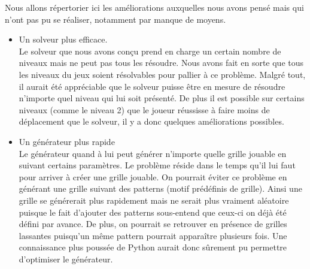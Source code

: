 \documentclass[a4paper,12pt]{article}
\begin{document}
Nous allons répertorier ici les améliorations auxquelles nous avons pensé mais qui n'ont pas pu se réaliser, notamment par manque de moyens.
\begin{itemize}
\item Un solveur plus efficace.\\
Le solveur que nous avons conçu prend en charge un certain nombre de niveaux mais ne peut pas tous les résoudre. Nous avons fait en sorte que tous les niveaux du jeux soient résolvables pour pallier à ce problème. Malgré tout, il aurait été appréciable que le solveur puisse être en mesure de résoudre n'importe quel niveau qui lui soit présenté. De plus il est possible sur certains niveaux (comme le niveau 2) que le joueur réussisse à faire moins de déplacement que le solveur, il y a donc quelques améliorations possibles.
\item Un générateur plus rapide\\
Le générateur quand à lui peut générer n'importe quelle grille jouable en suivant certains paramètres. Le problème réside dans le temps qu'il lui faut pour arriver à créer une grille jouable. On pourrait éviter ce problème en générant une grille suivant des patterns (motif prédéfinis de grille). Ainsi une grille se générerait plus rapidement mais ne serait plus vraiment aléatoire puisque le fait d'ajouter des patterns sous-entend que ceux-ci on déjà été défini par avance. De plus, on pourrait se retrouver en présence de grilles lassantes puisqu'un même pattern pourrait apparaître plusieurs fois. Une connaissance plus poussée de Python aurait donc sûrement pu permettre d'optimiser le générateur.
\end{itemize}


\appendix
\end{document}
